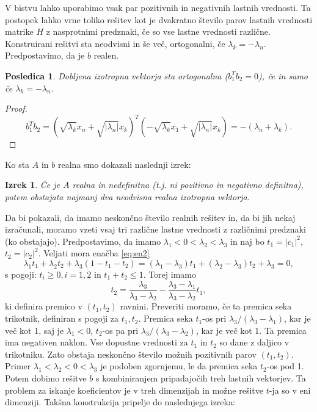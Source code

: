\documentclass[12pt,a4paper]{amsart}
\theoremstyle{definition}
\theoremstyle{plain}
\newtheorem{izrek}[definicija]{Izrek}
\newtheorem{posledica}[definicija]{Posledica}
\newcommand{\abs}[1]{ \left\lvert#1\right\rvert}
\begin{document}
V bistvu lahko uporabimo vsak par pozitivnih in negativnih lastnih vrednosti. Ta postopek lahko vrne toliko rešitev kot je dvakratno število parov lastnih vrednosti matrike $H$ z nasprotnimi predznaki, če so vse lastne vrednosti različne. Konstruirani rešitvi sta neodvisni in še več, ortogonalni, če $\lambda_k =-\lambda_n$. Predpostavimo, da je $b$ realen.
\begin{posledica}\cite{lipkin}
Dobljena izotropna vektorja sta ortogonalna ($b_1 ^T b_2=0$), če in samo če $\lambda_k=-\lambda_n$.
\end{posledica}
\begin{proof}%
$$b_1 ^T b_2=(\sqrt{\lambda_k}x_n+\sqrt{\abs{\lambda_n}}x_k)^T (-\sqrt{\lambda_k}x_1+\sqrt{\abs{\lambda_n}}x_k )= -(\lambda_n +\lambda_k).$$
\end{proof}
Ko sta $A$ in $b$ realna smo dokazali naslednji izrek:
\begin{izrek}
Če je $A$ realna in nedefinitna (t.j. ni pozitivno in negativno definitna), potem obstajata najmanj dva neodvisna realna izotropna vektorja.
\end{izrek}
Da bi pokazali, da imamo neskončno število realnih rešitev in, da bi jih nekaj izračunali, moramo vzeti vsaj tri različne lastne vrednosti z različnimi predznaki (ko obstajajo). Predpostavimo, da imamo $\lambda_1 <0<\lambda_2<\lambda_3$ in naj bo $t_1=\abs{c_1}^2$, $t_2=\abs{c_2}^2$. Veljati mora enačba \eqref{eq:en2}
\begin{equation}\label{trije}
\lambda_1 t_1 +\lambda_2 t_2 +\lambda_3 (1- t_1 -t_2)=(\lambda_1 -\lambda_3)t_1 +(\lambda_2 -\lambda_3)t_2 +\lambda_3=0,
\end{equation}
s pogoji: $t_i \ge 0, i=1,2$ in $t_1 +t_2\le1$. Torej imamo $$t_2=\frac{\lambda_3}{\lambda_3 - \lambda_2} -\frac{\lambda_3 -\lambda_1}{\lambda_3 -\lambda_2}t_1,$$
ki definira premico v $(t_1,t_2)$ ravnini. Preveriti moramo, če ta premica seka trikotnik, definiran s pogoji za $t_1,t_2$. Premica seka $t_1$-os pri $\lambda_3 /(\lambda_3 -\lambda_1)$, kar je več kot 1, saj je $\lambda_1 <0$, $t_2$-os pa pri $\lambda_3 /(\lambda_3 - \lambda_2)$, kar je več kot 1. Ta premica ima negativen naklon. Vse dopustne vrednosti za $t_1$ in $t_2$ so dane z daljico v trikotniku. Zato obstaja neskončno število možnih pozitivnih parov $(t_1,t_2)$.
Primer $\lambda_1 <\lambda_2<0<\lambda_3$ je podoben zgornjemu, le da premica seka $t_2$-os pod 1. Potem dobimo rešitve $b$ s kombiniranjem pripadajočih treh lastnih vektorjev. Ta problem za iskanje koeficientov je v treh dimenzijah in možne rešitve $t$-ja so v eni dimenziji. Takšna konstrukcija pripelje do naslednjega izreka:
\end{document}
